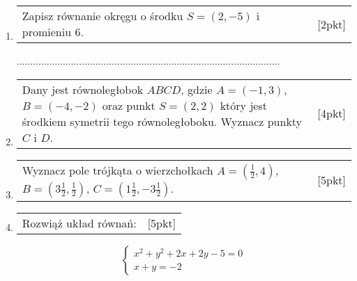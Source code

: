 \documentclass[12pt,a4paper]{article}
\begin{document}
\begin{enumerate}[1.]
	\item \begin{tabular}{p{13cm} r}
		Zapisz równanie okręgu o środku $S=(2,-5)$ i promieniu 6.&[2pkt]\\ 
	\end{tabular}
\vspace{0.5cm}

	.................................................................................................
	
	\item \begin{tabular}{p{13cm} r}
		Dany jest równoległobok $ABCD$, gdzie $A=(-1,3)$, $B=(-4,-2)$ oraz punkt $S=(2,2)$ który jest środkiem symetrii tego równoległoboku. Wyznacz punkty $C$ i $D$. &[4pkt]\\ 
	\end{tabular}
	\item \begin{tabular}{p{13cm} r}
		Wyznacz pole trójkąta o wierzchołkach \newline $A=(\frac{1}{2} ,4)$, $B=(3\frac{1}{2},\frac{1}{2})$, $C=(1\frac{1}{2},-3\frac{1}{2})$. &[5pkt]\\ 
	\end{tabular}
	\item \begin{tabular}{p{13cm} r}
		Rozwiąż układ równań: &[5pkt]\\ 
	\end{tabular}
		$$\left\{\begin{array}{l}
			x^2+y^2+2x+2y-5=0\\
			x+y=-2
		\end{array}\right.$$
	\end{enumerate}
\end{document}
